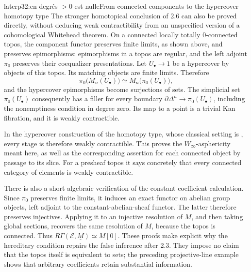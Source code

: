 \begin{dcomment}{later}{p32:en degrés $>0$ est nulle}{From connected components to the hypercover homotopy type}
The stronger homotopical conclusion of 2.6 can also be proved directly, without deducing weak contractibility from an unspecified version of a cohomological Whitehead theorem. On a connected locally totally $0$-connected topos, the component functor preserves finite limits, as shown above, and preserves epimorphisms: epimorphisms in a topos are regular, and the left adjoint $\pi _0$ preserves their coequalizer presentations. Let $U_\bullet\to1$ be a hypercover by objects of this topos. Its matching objects are finite limits. Therefore
\[
 \pi _0\bigl(M_n(U_\bullet)\bigr)
       \simeq M_n\bigl(\pi _0(U_\bullet)\bigr),
\]
and the hypercover epimorphisms become surjections of sets. The simplicial set $\pi _0(U_\bullet)$ consequently has a filler for every boundary $\partial\Delta^n\to\pi _0(U_\bullet)$, including the nonemptiness condition in degree zero. Its map to a point is a trivial Kan fibration, and it is weakly contractible.

In the hypercover construction of the homotopy type, whose classical setting is \citet[\S\S8--9]{ArtinMazur1969}, every stage is therefore weakly contractible. This proves the $W_\infty$-asphericity meant here, as well as the corresponding assertion for each connected object by passage to its slice. For a presheaf topos it says concretely that every connected category of elements is weakly contractible.

There is also a short algebraic verification of the constant-coefficient calculation. Since $\pi _0$ preserves finite limits, it induces an exact functor on abelian group objects, left adjoint to the constant-abelian-sheaf functor. The latter therefore preserves injectives. Applying it to an injective resolution of $M$, and then taking global sections, recovers the same resolution of $M$, because the topos is connected. Thus $R\Gamma(\mathcal E,\underline M)\simeq M[0]$. These proofs make explicit why the hereditary condition repairs the false inference after 2.3. They impose no claim that the topos itself is equivalent to sets; the preceding projective-line example shows that arbitrary coefficients retain substantial information.
\end{dcomment}


